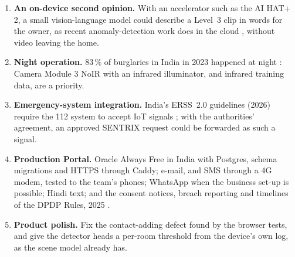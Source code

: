 \begin{enumerate}
\item \textbf{An on-device second opinion.} With an accelerator such as the AI HAT+ 2, a small vision-language model could describe a Level~3 clip in words for the owner, as recent anomaly-detection work does in the cloud \cite{zanella2024lavad, zhang2025holmesvau}, without video leaving the home.
\item \textbf{Night operation.} 83\,\% of burglaries in India in 2023 happened at night \cite{ncrb2025cii2023}: Camera Module 3 NoIR with an infrared illuminator, and infrared training data, are a priority.
\item \textbf{Emergency-system integration.} India's ERSS~2.0 guidelines (2026) require the 112 system to accept IoT signals \cite{mha2026erss}; with the authorities' agreement, an approved SENTRIX request could be forwarded as such a signal.
\item \textbf{Production Portal.} Oracle Always Free in India with Postgres, schema migrations and HTTPS through Caddy; e-mail, and SMS through a 4G modem, tested to the team's phones; WhatsApp when the business set-up is possible; Hindi text; and the consent notices, breach reporting and timelines of the DPDP Rules, 2025 \cite{pib2025dpdp}.
\item \textbf{Product polish.} Fix the contact-adding defect found by the browser tests, and give the detector heads a per-room threshold from the device's own log, as the scene model already has.
\end{enumerate}
